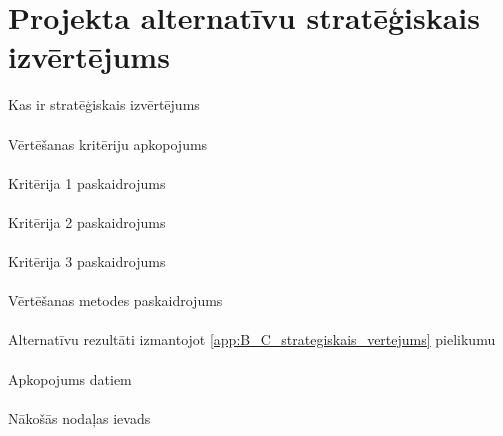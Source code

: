 \section{Projekta alternatīvu stratēģiskais izvērtējums}
Kas ir stratēģiskais izvērtējums
\paragraph{}
Vērtēšanas kritēriju apkopojums
\paragraph{}
Kritērija 1 paskaidrojums
\paragraph{}
Kritērija 2 paskaidrojums
\paragraph{}
Kritērija 3 paskaidrojums
\paragraph{}
Vērtēšanas metodes paskaidrojums
\paragraph{}
Alternatīvu rezultāti izmantojot \ref{app:B_C_strategiskais_vertejums} pielikumu
\paragraph{}
Apkopojums datiem
\paragraph{}
Nākošās nodaļas ievads
